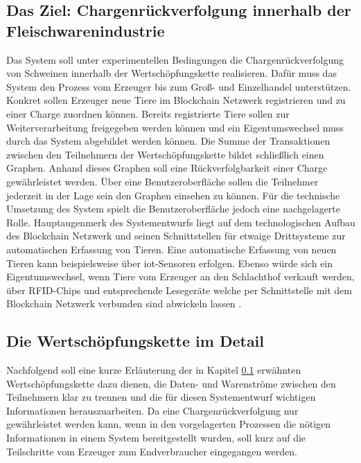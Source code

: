 \subsection{Das Ziel: Chargenrückverfolgung innerhalb der Fleischwarenindustrie} \label{goal-description}
Das System soll unter experimentellen Bedingungen die Chargenrückverfolgung von Schweinen innerhalb der Wertschöpfungskette realisieren. Dafür muss das System den Prozess vom Erzeuger bis zum Groß- und Einzelhandel unterstützen. Konkret sollen Erzeuger neue Tiere im Blockchain Netzwerk registrieren und zu einer Charge zuordnen können. Bereits registrierte Tiere sollen zur Weiterverarbeitung freigegeben werden können und ein Eigentumswechsel muss durch das System abgebildet werden können. Die Summe der Transaktionen zwischen den Teilnehmern der Wertschöpfungskette bildet schließlich einen Graphen. Anhand dieses Graphen soll eine Rückverfolgbarkeit einer Charge gewährleistet werden. Über eine Benutzeroberfläche sollen die Teilnehmer jederzeit in der Lage sein den Graphen einsehen zu können. Für die technische Umsetzung des System spielt die Benutzeroberfläche jedoch eine nachgelagerte Rolle. Hauptaugenmerk des Systementwurfs liegt auf dem technologischen Aufbau des Blockchain Netzwerk und seinen Schnittstellen für etwaige Drittsysteme zur automatischen Erfassung von Tieren. Eine automatische Erfassung von neuen Tieren kann beispielsweise über \ac{iot}-Sensoren erfolgen. Ebenso würde sich ein Eigentumswechsel, wenn Tiere vom Erzeuger an den Schlachthof verkauft werden, über RFID-Chips und entsprechende Lesegeräte welche per Schnittstelle mit dem Blockchain Netzwerk verbunden sind abwickeln lassen \citep{Dorri2017, Samaniego2016}.

\subsection{Die Wertschöpfungskette im Detail}
Nachfolgend soll eine kurze Erläuterung der in Kapitel \ref{goal-description} erwähnten Wertschöpfungskette dazu dienen, die Daten- und Warenströme zwischen den Teilnehmern klar zu trennen und die für diesen Systementwurf wichtigen Informationen herauszuarbeiten. Da eine Chargenrückverfolgung nur gewährleistet werden kann, wenn in den vorgelagerten Prozessen die nötigen Informationen in einem System bereitgestellt wurden, soll kurz auf die Teilschritte vom Erzeuger zum Endverbraucher eingegangen werden.

